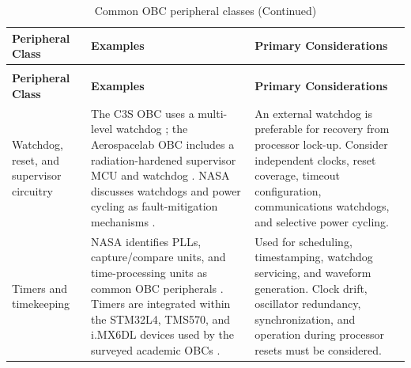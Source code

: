 \documentclass[10pt]{../datasheet}
\let\cite\citep
\begin{document}
\renewcommand{\arraystretch}{1.15}
\begin{longtable}{|p{3.0cm}|p{6.2cm}|p{6.0cm}|}
  \caption{Common OBC peripheral classes} \label{tab:obc_peripherals}          \\ \hline
  \textbf{Peripheral Class}                                                  &
  \textbf{Examples}                                                          &
  \textbf{Primary Considerations}                                              \\ \hline
  \endfirsthead
  \caption[]{Common OBC peripheral classes (Continued)}                        \\ \hline
  \textbf{Peripheral Class}                                                  &
  \textbf{Examples}                                                          &
  \textbf{Primary Considerations}                                              \\ \hline
  \endhead
  \hline
  \endfoot

  Watchdog, reset, and supervisor circuitry                                  &
  The C3S OBC uses a multi-level watchdog
  \cite[p.~229]{nasa_soa_2023}
  \cite[p.~232]{nasa_soa_2024}
  \cite[p.~230]{nasa_soa_2026}; the Aerospacelab OBC includes a
  radiation-hardened supervisor MCU and watchdog
  \cite[p.~232]{nasa_soa_2024}
  \cite[p.~229]{nasa_soa_2026}.
  NASA discusses watchdogs and power cycling as fault-mitigation mechanisms
  \cite[p.~220]{nasa_soa_2022}
  \cite[p.~236]{nasa_soa_2023}
  \cite[p.~241]{nasa_soa_2024}
  \cite[pp.~220--222]{nasa_soa_2026}.                                        &
  An external watchdog is preferable for recovery from processor lock-up.
  Consider independent clocks, reset coverage, timeout configuration,
  communications watchdogs, and selective power cycling.                       \\ \hline

  Timers and timekeeping                                                     &
  NASA identifies PLLs, capture/compare units, and time-processing units as
  common OBC peripherals
  \cite[p.~219]{nasa_soa_2022}
  \cite[p.~235]{nasa_soa_2023}
  \cite[p.~240]{nasa_soa_2024}
  \cite[p.~224]{nasa_soa_2026}.
  Timers are integrated within the STM32L4, TMS570, and i.MX6DL devices used by
  the surveyed academic OBCs
  \cite{stm32l4_vst104_pub,athena_obc_ti_prod,orcasat_obc_ds,loris_obc_nxp}. &
  Used for scheduling, timestamping, watchdog servicing, and waveform
  generation. Clock drift, oscillator redundancy, synchronization, and
  operation during processor resets must be considered.                        \\ \hline


\end{longtable}
\end{document}
